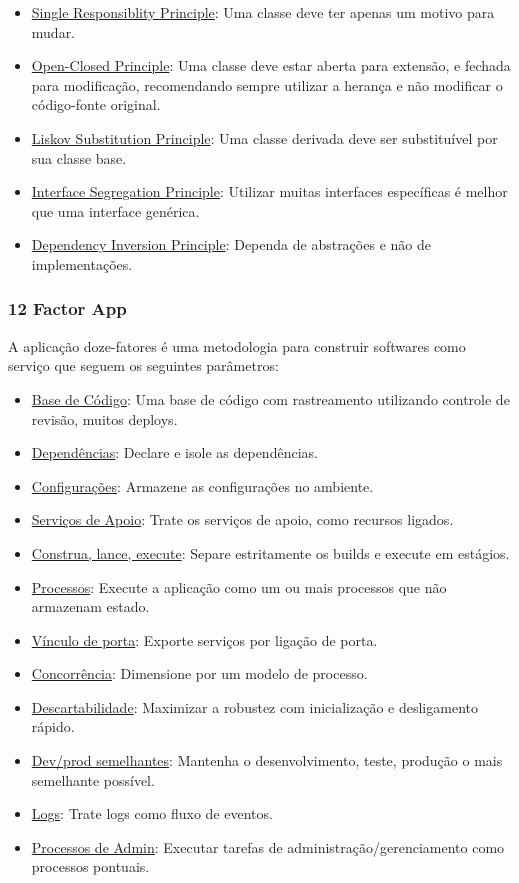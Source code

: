 \begin{itemize}
    \item \underline{Single Responsiblity Principle}: Uma classe deve ter apenas um motivo para mudar.
    \item \underline{Open-Closed Principle}: Uma classe deve estar aberta para extensão, e fechada para modificação, recomendando sempre utilizar a herança e não modificar o código-fonte original.
    \item \underline{Liskov Substitution Principle}: Uma classe derivada deve ser substituível por sua classe base.
    \item \underline{Interface Segregation Principle}: Utilizar muitas interfaces específicas é melhor que uma interface genérica.
    \item \underline{Dependency Inversion Principle}: Dependa de abstrações e não de implementações.
\end{itemize}

\subsubsection{12 Factor App}

A aplicação doze-fatores é uma metodologia para construir softwares como serviço que seguem os seguintes parâmetros:

\begin{itemize}
    \item \underline{Base de Código}: Uma base de código com rastreamento utilizando controle de revisão, muitos \glspl{deploy}.
    \item \underline{Dependências}: Declare e isole as dependências.
    \item \underline{Configurações}: Armazene as configurações no ambiente.
    \item \underline{Serviços de Apoio}: Trate os serviços de apoio, como recursos ligados.
    \item \underline{Construa, lance, execute}: Separe estritamente os builds e execute em estágios.
    \item \underline{Processos}: Execute a aplicação como um ou mais processos que não armazenam estado.
    \item \underline{Vínculo de porta}: Exporte serviços por ligação de porta.
    \item \underline{Concorrência}: Dimensione por um modelo de processo.
    \item \underline{Descartabilidade}: Maximizar a robustez com inicialização e desligamento rápido.
    \item \underline{Dev/prod semelhantes}: Mantenha o desenvolvimento, teste, produção o mais semelhante possível.
    \item \underline{Logs}: Trate logs como fluxo de eventos.
    \item \underline{Processos de Admin}: Executar tarefas de administração/gerenciamento como processos pontuais.
\end{itemize}

